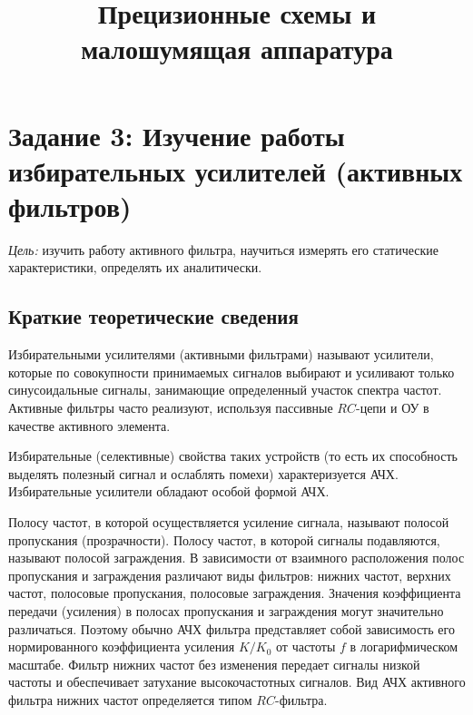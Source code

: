 \title{Прецизионные схемы и малошумящая аппаратура}
\author{}


\section{Задание 3: Изучение работы избирательных усилителей (активных фильтров)}

{\it Цель:} изучить работу активного фильтра, научиться измерять его статические характеристики, определять их аналитически.
 
\subsection{Краткие теоретические сведения}

Избирательными усилителями (активными фильтрами) называют усилители, которые по совокупности принимаемых сигналов
выбирают и усиливают только синусоидальные сигналы, занимающие определенный участок спектра частот.
Активные фильтры часто реализуют, используя пассивные $RC$-цепи и ОУ в качестве активного элемента.

Избирательные (селективные) свойства таких устройств (то есть их способность выделять полезный сигнал и ослаблять помехи)
характеризуется АЧХ. Избирательные усилители обладают особой формой АЧХ.

Полосу частот, в которой осуществляется усиление сигнала, называют полосой пропускания (прозрачности). Полосу частот,
в которой сигналы подавляются, называют полосой заграждения. В зависимости от взаимного расположения полос
пропускания и заграждения различают виды фильтров: нижних частот, верхних частот, полосовые пропускания,
полосовые заграждения. Значения коэффициента передачи (усиления) в полосах пропускания и заграждения 
могут значительно различаться. Поэтому обычно АЧХ фильтра представляет собой зависимость его нормированного 
коэффициента усиления $K/K_{0}$ от частоты $f$ в логарифмическом масштабе. Фильтр нижних частот без изменения
передает сигналы низкой частоты и обеспечивает затухание высокочастотных сигналов. Вид АЧХ активного фильтра 
нижних частот определяется типом $RC$-фильтра.

